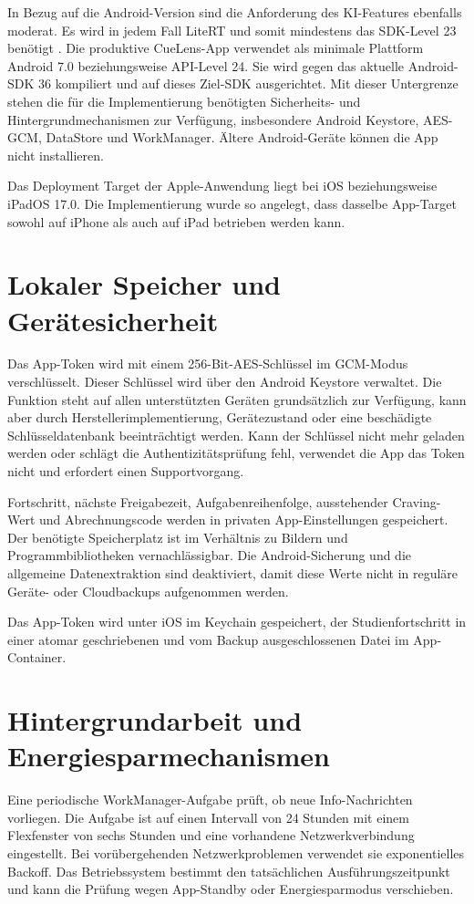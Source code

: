In Bezug auf die Android-Version sind die Anforderung des KI-Features ebenfalls moderat. Es wird in jedem Fall LiteRT und somit mindestens das SDK-Level 23 benötigt \cite{google_litert_android_2026}. Die produktive CueLens-App verwendet als minimale Plattform Android 7.0 beziehungsweise API-Level 24. Sie wird gegen das aktuelle Android-SDK 36 kompiliert und auf dieses Ziel-SDK ausgerichtet. Mit dieser Untergrenze stehen die für die Implementierung benötigten Sicherheits- und Hintergrundmechanismen zur Verfügung, insbesondere Android Keystore, AES-GCM, DataStore und WorkManager. Ältere Android-Geräte können die App nicht installieren.

Das Deployment Target der Apple-Anwendung liegt bei iOS beziehungsweise iPadOS 17.0. Die Implementierung wurde so angelegt, dass dasselbe App-Target sowohl auf iPhone als auch auf iPad betrieben werden kann.

\section{Lokaler Speicher und Gerätesicherheit}
Das App-Token wird mit einem 256-Bit-AES-Schlüssel im GCM-Modus verschlüsselt. Dieser Schlüssel wird über den Android Keystore verwaltet. Die Funktion steht auf allen unterstützten Geräten grundsätzlich zur Verfügung, kann aber durch Herstellerimplementierung, Gerätezustand oder eine beschädigte Schlüsseldatenbank beeinträchtigt werden. Kann der Schlüssel nicht mehr geladen werden oder schlägt die Authentizitätsprüfung fehl, verwendet die App das Token nicht und erfordert einen Supportvorgang.

Fortschritt, nächste Freigabezeit, Aufgabenreihenfolge, ausstehender Craving-Wert und Abrechnungscode werden in privaten App-Einstellungen gespeichert. Der benötigte Speicherplatz ist im Verhältnis zu Bildern und Programmbibliotheken vernachlässigbar. Die Android-Sicherung und die allgemeine Datenextraktion sind deaktiviert, damit diese Werte nicht in reguläre Geräte- oder Cloudbackups aufgenommen werden.

Das App-Token wird unter iOS im Keychain gespeichert, der Studienfortschritt in einer atomar geschriebenen und vom Backup ausgeschlossenen Datei im App-Container. 

\section{Hintergrundarbeit und Energiesparmechanismen}

Eine periodische WorkManager-Aufgabe prüft, ob neue Info-Nachrichten vorliegen. Die Aufgabe ist auf einen Intervall von 24 Stunden mit einem Flexfenster von sechs Stunden und eine vorhandene Netzwerkverbindung eingestellt. Bei vorübergehenden Netzwerkproblemen verwendet sie exponentielles Backoff. Das Betriebssystem bestimmt den tatsächlichen Ausführungszeitpunkt und kann die Prüfung wegen App-Standby oder Energiesparmodus verschieben.


